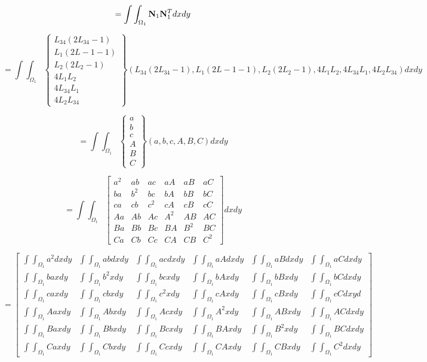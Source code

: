 \documentclass{jarticle}
\begin{document}
\[
=\int\int_{\Omega_1}{\bf N}_1{\bf N}_1^Tdxdy 
\]


\[
=\int\int_{\Omega_1}\left\{\begin{array}{c}
L_{34}(2L_{34}-1)\\
L_{1}(2L-{1}-1)\\
L_{2}(2L_{2}-1)\\
4L_{1}L_{2}\\
4L_{34}L_{1}\\
4L_{2}L_{34}
\end{array}\right\}(
L_{34}(2L_{34}-1),
L_{1}(2L-{1}-1),
L_{2}(2L_{2}-1),
4L_{1}L_{2},
4L_{34}L_{1},
4L_{2}L_{34}
)dxdy 
\]


\[
=\int\int_{\Omega_1}\left\{\begin{array}{c}
a\\
b\\
c\\
A\\
B\\
C
\end{array}\right\}(
a,b,c,A,B,C
)dxdy 
\]

\[
=\int\int_{\Omega_1}\left[\begin{array}{cccccc}
    a^2&ab&ac&aA&aB&aC\\
    ba&b^2&bc&bA&bB&bC\\
    ca&cb&c^2&cA&cB&cC\\
    Aa&Ab&Ac&A^2&AB&AC\\
    Ba&Bb&Bc&BA&B^2&BC\\
    Ca&Cb&Cc&CA&CB&C^2
\end{array}\right]dxdy
\]



\[
=\left[\begin{array}{cccccc}
    \int\int_{\Omega_1}a^2dxdy&\int\int_{\Omega_1}abdxdy&\int\int_{\Omega_1}acdxdy&\int\int_{\Omega_1}aAdxdy&\int\int_{\Omega_1}aBdxdy&\int\int_{\Omega_1}aCdxdy\\
    \int\int_{\Omega_1}baxdy&\int\int_{\Omega_1}b^2xdy&\int\int_{\Omega_1}bcxdy&\int\int_{\Omega_1}bAxdy&\int\int_{\Omega_1}bBxdy&\int\int_{\Omega_1}bCdxdy\\
    \int\int_{\Omega_1}caxdy&\int\int_{\Omega_1}cbxdy&\int\int_{\Omega_1}c^2xdy&\int\int_{\Omega_1}cAxdy&\int\int_{\Omega_1}cBxdy&\int\int_{\Omega_1}cCdxyd\\
    \int\int_{\Omega_1}Aaxdy&\int\int_{\Omega_1}Abxdy&\int\int_{\Omega_1}Acxdy&\int\int_{\Omega_1}A^2xdy&\int\int_{\Omega_1}ABxdy&\int\int_{\Omega_1}ACdxdy\\
    \int\int_{\Omega_1}Baxdy&\int\int_{\Omega_1}Bbxdy&\int\int_{\Omega_1}Bcxdy&\int\int_{\Omega_1}BAxdy&\int\int_{\Omega_1}B^2xdy&\int\int_{\Omega_1}BCdxdy\\
    \int\int_{\Omega_1}Caxdy&\int\int_{\Omega_1}Cbxdy&\int\int_{\Omega_1}Ccxdy&\int\int_{\Omega_1}CAxdy&\int\int_{\Omega_1}CBxdy&\int\int_{\Omega_1}C^2dxdy
\end{array}\right]
\]
\end{document}
